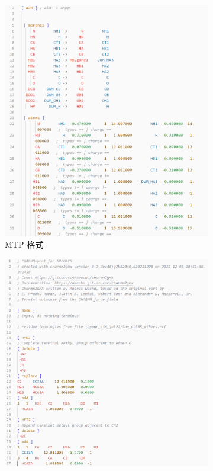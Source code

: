 \begin{figure}[!h]
    \centering
    \begin{subfigure}[c]{0.49\textwidth}
        \centering
        \includegraphics[width=\textwidth]{../images/mtp.png}
        \caption{MTP 格式}
        \label{fig:mtp-highlighting}
    \end{subfigure}
    \hfill
    \begin{subfigure}[c]{0.49\textwidth}
        \centering
        \includegraphics[width=\textwidth]{../images/tdb.png}

\end{subfigure}
\end{figure}
